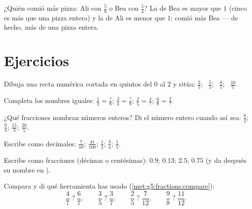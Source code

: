 \begin{example}\label{ex:g5:fractions:compare}
¿Quién comió más pizza: Ali con $\frac58$ o Bea con $\frac54$? La
 de Bea es mayor que $1$ (cinco  es más que una pizza
entera) y la de Ali es menor que $1$: comió más Bea --- de hecho, más de una
pizza entera.
\end{example}

\section{Ejercicios}

\begin{exercise}[$\star$]\label{exo:g5:fractions:1}
Dibuja una recta numérica cortada en quintos del $0$ al $2$ y sitúa:
$\frac25$; \ $\frac55$; \ $\frac85$; \ $\frac{10}{5}$.
\end{exercise}

\begin{exercise}[$\star$]\label{exo:g5:fractions:2}
Completa los nombres iguales:
$\frac12 = \frac{?}{8}$; \quad
$\frac34 = \frac{?}{8}$; \quad
$\frac{2}{5} = \frac{4}{?}$; \quad
$\frac{6}{9} = \frac{2}{?}$.
\end{exercise}

\begin{exercise}[$\star$]\label{exo:g5:fractions:3}
¿Qué fracciones nombran números enteros? Di el número entero cuando así sea:
$\frac82$; \quad $\frac{9}{4}$; \quad $\frac{15}{3}$; \quad
$\frac{20}{5}$.
\end{exercise}

\begin{exercise}[$\star$]\label{exo:g5:fractions:4}
Escribe como decimales: $\frac{7}{10}$; \quad $\frac{41}{100}$; \quad
$\frac12$; \quad $\frac34$; \quad $\frac15$.
\end{exercise}

\begin{exercise}[$\star$]\label{exo:g5:fractions:5}
Escribe como fracciones (décimas o centésimas): $0.9$; \quad $0.13$;
\quad $2.5$; \quad $0.75$ (y da después su nombre en ).
\end{exercise}

\begin{exercise}[$\star$]\label{exo:g5:fractions:6}
Compara y di qué herramienta has usado
(\cref{met:g5:fractions:compare}):
\[
\frac47 \;?\; \frac67, \qquad
\frac35 \;?\; \frac37, \qquad
\frac25 \;?\; \frac{7}{12}, \qquad
\frac98 \;?\; \frac{11}{12} .
\]
\end{exercise}

